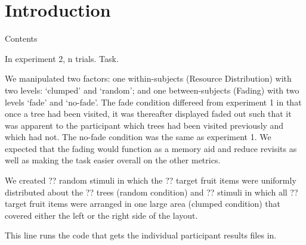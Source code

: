 \documentclass[
]{book}
\begin{document}
\hypertarget{introduction-1}{%
\chapter{Introduction}\label{introduction-1}}

Contents

In experiment 2, n trials. Task.

We manipulated two factors: one within-subjects (Resource Distribution) with two levels: `clumped' and `random'; and one between-subjects (Fading) with two levels `fade' and `no-fade'. The fade condition differeed from experiment 1 in that once a tree had been visited, it was thereafter displayed faded out such that it was apparent to the participant which trees had been visited previously and which had not. The no-fade condition was the same as experiment 1. We expected that the fading would function as a memory aid and reduce revisits as well as making the task easier overall on the other metrics.

We created ?? random stimuli in which the ?? target fruit items were uniformly distributed about the ?? trees (random condition) and ?? stimuli in which all ?? target fruit items were arranged in one large area (clumped condition) that covered either the left or the right side of the layout.

This line runs the code that gets the individual participant results files in.
\end{document}
